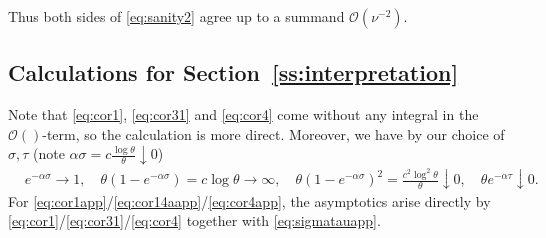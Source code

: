 \documentclass{imsart}
\theoremstyle{plain}
\theoremstyle{definition}
\begin{document}
Thus both sides of \eqref{eq:sanity2} agree up to a summand $\mathcal O(\nu^{-2})$.

\subsection{Calculations for Section~\ref{ss:interpretation}}
\label{rem:interpretation}
Note that \eqref{eq:cor1},  \eqref{eq:cor31} and \eqref{eq:cor4} come without any integral in the $\mathcal O()$-term, so the calculation is more direct. Moreover, we have by our choice of $\sigma, \tau$ (note $\alpha \sigma = c \tfrac{\log\theta}{\theta} \downarrow 0$)
\begin{align}
    \label{eq:sigmatauapp}
    & e^{-\alpha \sigma} \to 1, \quad \theta(1 - e^{-\alpha\sigma}) = c \log\theta \to \infty, \quad \theta(1 - e^{-\alpha\sigma})^2 = \frac{c^2 \log^2\theta}{\theta} \downarrow 0, \quad \theta e^{-\alpha \tau} \downarrow 0.
\end{align}
For \eqref{eq:cor1app}/\eqref{eq:cor14aapp}/\eqref{eq:cor4app}, the asymptotics arise directly by \eqref{eq:cor1}/\eqref{eq:cor31}/\eqref{eq:cor4} together with \eqref{eq:sigmatauapp}. 
\end{document}

